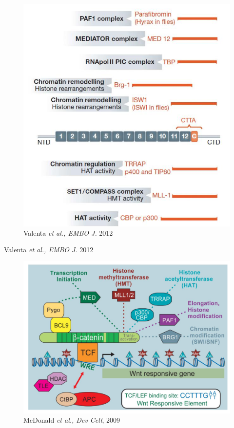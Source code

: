 \begin{figure}
\centering
\includegraphics[width=\textwidth]{../_resources/Screenshot_2022-10-07_at_11-52-13.png}
\caption{Valenta \emph{et al., EMBO J.} 2012}
\end{figure}

Valenta \emph{et al., EMBO J.} 2012

\begin{figure}
\centering
\includegraphics[width=\textwidth]{../_resources/Screenshot_2022-10-07_at_11-52-58.png}
\caption{McDonald \emph{et al., Dev Cell}, 2009}
\end{figure}

